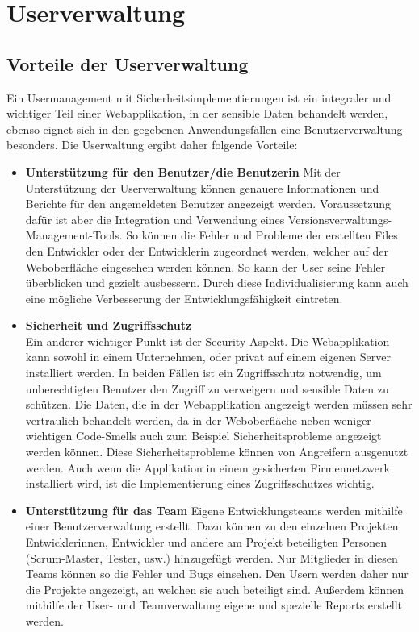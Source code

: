 \section{Userverwaltung}
\subsection{Vorteile der Userverwaltung}
Ein Usermanagement mit Sicherheitsimplementierungen ist ein integraler und wichtiger Teil einer Webapplikation, in der sensible Daten behandelt werden, ebenso eignet sich in den gegebenen Anwendungsfällen eine Benutzerverwaltung besonders. Die Userwaltung ergibt daher folgende Vorteile:
\begin{itemize} 
  \item \textbf{Unterstützung für den Benutzer/die Benutzerin} 
Mit der Unterstützung der Userverwaltung können genauere Informationen und Berichte für den angemeldeten Benutzer angezeigt werden. Voraussetzung dafür ist aber die Integration und Verwendung eines Versionsverwaltungs-Management-Tools. So können die Fehler und Probleme der erstellten Files den Entwickler oder der Entwicklerin zugeordnet werden, welcher auf der Weboberfläche eingesehen werden können. So kann der User seine Fehler überblicken und gezielt ausbessern. Durch diese Individualisierung kann auch eine mögliche Verbesserung der Entwicklungsfähigkeit eintreten.  
    \item \textbf{Sicherheit und Zugriffsschutz} \\ Ein anderer wichtiger Punkt ist der Security-Aspekt. Die Webapplikation kann sowohl in einem Unternehmen, oder privat auf einem eigenen Server installiert werden. In beiden Fällen ist ein Zugriffsschutz notwendig, um unberechtigten Benutzer den Zugriff zu verweigern und sensible Daten zu schützen. Die Daten, die in der Webapplikation angezeigt werden müssen sehr vertraulich behandelt werden, da in der Weboberfläche neben weniger wichtigen Code-Smells auch zum Beispiel Sicherheitsprobleme angezeigt werden können. Diese Sicherheitsprobleme können von Angreifern ausgenutzt werden. Auch wenn die Applikation in einem gesicherten Firmennetzwerk installiert wird, ist die Implementierung eines Zugriffsschutzes wichtig. 
\item \textbf{Unterstützung für das Team}
Eigene Entwicklungsteams werden mithilfe einer Benutzerverwaltung erstellt. Dazu können zu den einzelnen Projekten Entwicklerinnen, Entwickler und andere am Projekt beteiligten Personen (Scrum-Master, Tester, usw.) hinzugefügt werden. Nur Mitglieder in diesen Teams können so die Fehler und Bugs einsehen. Den Usern werden daher nur die Projekte angezeigt, an welchen sie auch beteiligt sind. Außerdem können mithilfe der User- und Teamverwaltung eigene und spezielle Reports erstellt werden.
\end{itemize}

